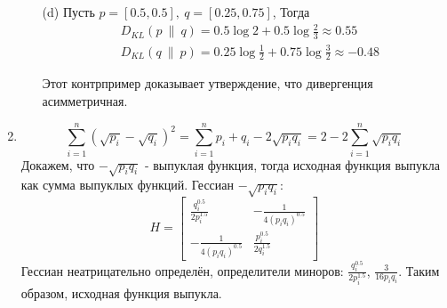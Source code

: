 \documentclass{article}
\begin{document}
\begin{enumerate}
\begin{itemize}
              \item[(d)]
                  Пусть $p = [0.5, 0.5], \ q = [0.25, 0.75]$, Тогда
                  \begin{align*}
                       & D_{KL}(p \ \| \ q) = 0.5\log{2} + 0.5\log{\frac{2}{3}} \approx 0.55              \\
                       & D_{KL}(q \ \| \ p) = 0.25\log{\frac{1}{2}} + 0.75\log{\frac{3}{2}} \approx -0.48
                  \end{align*}

                  Этот контрпример доказывает утверждение, что дивергенция асимметричная.
          \end{itemize}

    \item
          $$
              \sum_{i=1}^n (\sqrt{p_i} - \sqrt{q_i})^2 = \sum_{i=1}^n p_i + q_i - 2\sqrt{p_i q_i} = 2 - 2\sum_{i=1}^n \sqrt{p_i q_i}
          $$
          Докажем, что $-\sqrt{p_i q_i}$ - выпуклая функция, тогда исходная функция выпукла как сумма выпуклых функций. Гессиан $-\sqrt{p_i q_i}$:
          $$
              H =
              \begin{bmatrix}
                  \frac{q_i^{0.5}}{2p_i^{1.5}} & -\frac{1}{4(p_i q_i)^{0.5}}  \\
                  -\frac{1}{4(p_i q_i)^{0.5}}  & \frac{p_i^{0.5}}{2q_i^{1.5}}
              \end{bmatrix}
          $$
          Гессиан неатрицательно определён, определители миноров: $\frac{q_i^{0.5}}{2p_i^{1.5}}$, $\frac{3}{16p_i q_i}$. Таким образом, исходная функция выпукла.
\end{enumerate}
\end{document}
